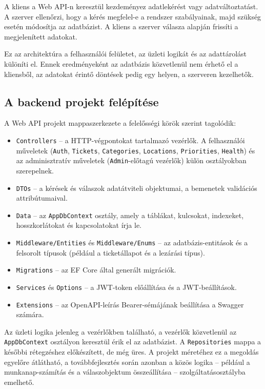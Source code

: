\documentclass[12pt, a4paper, twoside]{article}
\begin{document}
A kliens a Web API-n keresztül kezdeményez adatlekérést vagy adatváltoztatást. A szerver ellenőrzi, hogy a kérés megfelel-e a rendszer szabályainak, majd szükség esetén módosítja az adatbázist. A kliens a szerver válasza alapján frissíti a megjelenített adatokat.

Ez az architektúra a felhasználói felületet, az üzleti logikát és az adattárolást különíti el. Ennek eredményeként az adatbázis közvetlenül nem érhető el a kliensből, az adatokat érintő döntések pedig egy helyen, a szerveren kezelhetők.

\subsection{A backend projekt felépítése}

A Web API projekt mappaszerkezete a felelősségi körök szerint tagolódik:

\begin{itemize}
    \item \texttt{Controllers} -- a HTTP-végpontokat tartalmazó vezérlők. A felhasználói műveletek (\texttt{Auth}, \texttt{Tickets}, \texttt{Categories}, \texttt{Locations}, \texttt{Priorities}, \texttt{Health}) és az adminisztratív műveletek (\texttt{Admin}-előtagú vezérlők) külön osztályokban szerepelnek.
    \item \texttt{DTOs} -- a kérések és válaszok adatátviteli objektumai, a bemenetek validációs attribútumaival.
    \item \texttt{Data} -- az \texttt{AppDbContext} osztály, amely a táblákat, kulcsokat, indexeket, hosszkorlátokat és kapcsolatokat írja le.
    \item \texttt{Middleware/Entities} és \texttt{Middleware/Enums} -- az adatbázis-entitások és a felsorolt típusok (például a ticketállapot és a lezárási típus).
    \item \texttt{Migrations} -- az EF Core által generált migrációk.
    \item \texttt{Services} és \texttt{Options} -- a JWT-token előállítása és a JWT-beállítások.
    \item \texttt{Extensions} -- az OpenAPI-leírás Bearer-sémájának beállítása a Swagger számára.
\end{itemize}

Az üzleti logika jelenleg a vezérlőkben található, a vezérlők közvetlenül az \texttt{AppDbContext} osztályon keresztül érik el az adatbázist. A \texttt{Repositories} mappa a későbbi rétegzéshez előkészített, de még üres. A projekt méretéhez ez a megoldás egyelőre átlátható, a továbbfejlesztés során azonban a közös logika -- például a munkanap-számítás és a válaszobjektum összeállítása -- szolgáltatásosztályba emelhető.
\end{document}
